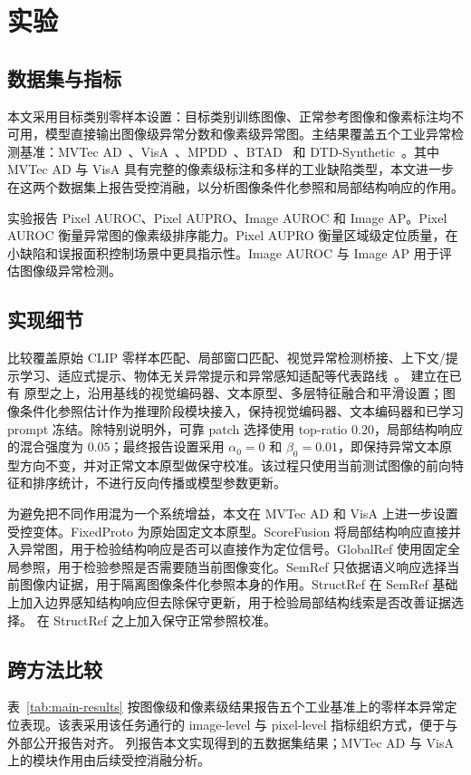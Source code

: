 \section{实验}
\label{sec:experiments}

\subsection{数据集与指标}

本文采用目标类别零样本设置：目标类别训练图像、正常参考图像和像素标注均不可用，模型直接输出图像级异常分数和像素级异常图。主结果覆盖五个工业异常检测基准：MVTec AD~\cite{bergmann2019mvtec}、VisA~\cite{zou2022visa}、MPDD~\cite{jezek2021deep}、BTAD~\cite{mishra2021vt} 和 DTD-Synthetic~\cite{aota2023zero}。其中 MVTec AD 与 VisA 具有完整的像素级标注和多样的工业缺陷类型，本文进一步在这两个数据集上报告受控消融，以分析图像条件化参照和局部结构响应的作用。

实验报告 Pixel AUROC、Pixel AUPRO、Image AUROC 和 Image AP。Pixel AUROC 衡量异常图的像素级排序能力。Pixel AUPRO 衡量区域级定位质量，在小缺陷和误报面积控制场景中更具指示性。Image AUROC 与 Image AP 用于评估图像级异常检测。

\subsection{实现细节}

比较覆盖原始 CLIP 零样本匹配、局部窗口匹配、视觉异常检测桥接、上下文/提示学习、适应式提示、物体无关异常提示和异常感知适配等代表路线~\cite{radford2021clip,jeong2023winclip,chen2023aprilgan,zhou2022coop,cao2024adaclip,zhou2024anomalyclip,ma2025aaclip}。\method{} 建立在已有 \clipzsad{} 原型之上，沿用基线的视觉编码器、文本原型、多层特征融合和平滑设置；图像条件化参照估计作为推理阶段模块接入，保持视觉编码器、文本编码器和已学习 prompt 冻结。除特别说明外，可靠 patch 选择使用 top-ratio $0.20$，局部结构响应的混合强度为 $0.05$；最终报告设置采用 $\alpha_0=0$ 和 $\beta_0=0.01$，即保持异常文本原型方向不变，并对正常文本原型做保守校准。该过程只使用当前测试图像的前向特征和排序统计，不进行反向传播或模型参数更新。

为避免把不同作用混为一个系统增益，本文在 MVTec AD 和 VisA 上进一步设置受控变体。FixedProto 为原始固定文本原型。ScoreFusion 将局部结构响应直接并入异常图，用于检验结构响应是否可以直接作为定位信号。GlobalRef 使用固定全局参照，用于检验参照是否需要随当前图像变化。SemRef 只依据语义响应选择当前图像内证据，用于隔离图像条件化参照本身的作用。StructRef 在 SemRef 基础上加入边界感知结构响应但去除保守更新，用于检验局部结构线索是否改善证据选择。\method{} 在 StructRef 之上加入保守正常参照校准。

\subsection{跨方法比较}

表~\ref{tab:main-results} 按图像级和像素级结果报告五个工业基准上的零样本异常定位表现。该表采用该任务通行的 image-level 与 pixel-level 指标组织方式，便于与外部公开报告对齐。\method{} 列报告本文实现得到的五数据集结果；MVTec AD 与 VisA 上的模块作用由后续受控消融分析。


